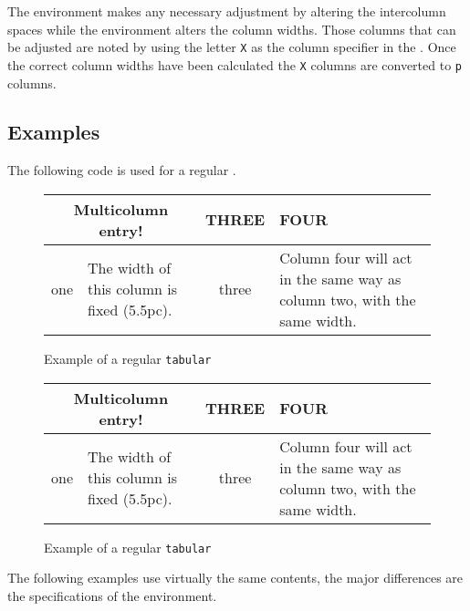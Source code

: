     The  environment makes any necessary adjustment by altering
the intercolumn spaces while the 
 environment alters
the column widths. Those columns that can 
be adjusted are noted by
using the letter \texttt{X} as the column 
specifier in the .
Once the correct column widths have been calculated the \texttt{X}
columns are converted to \texttt{p} columns.

 \subsection{Examples}

    The following code is used for a regular .
\begin{lcode}
\begin{figure}
\centering
\caption{Example of a regular \texttt{tabular}}
\begin{tabular}{|c|p{5.5pc}|c|p{5.5pc}|}  \hline
\multicolumn{2}{|c|}{Multicolumn entry!} & THREE & FOUR \\ \hline
one &
\raggedright\arraybackslash The width of this column is fixed 
(5.5pc). & three &
\raggedright\arraybackslash Column four will act in the same 
way as column two, with the same width.\\
\hline
\end{tabular}
\end{figure}
\end{lcode}

\begin{figure}
\centering
\caption{Example of a regular \texttt{tabular}}
\begin{tabular}{|c|p{5.5pc}|c|p{5.5pc}|}   \hline
\multicolumn{2}{|c|}{Multicolumn entry!} & THREE & FOUR \\  \hline
one &
\raggedright\arraybackslash The width of this column is fixed (5.5pc). &
three &
\raggedright\arraybackslash Column four will act in the same way as
  column two, with the same width.\\
 \hline
\end{tabular}
\end{figure}


    The following examples use virtually the same contents, the major
differences are the specifications of the environment.


